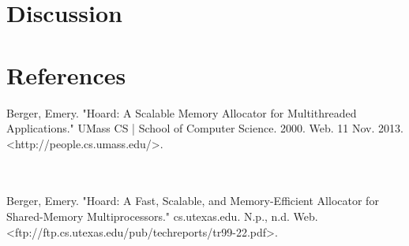 \documentclass{article}
\begin{document}
\section{Discussion}
 

\newpage
\noindent
\section{References}

Berger, Emery. "Hoard: A Scalable Memory Allocator for Multithreaded Applications." UMass CS | School of Computer Science. 2000. Web. 11 Nov. 2013. <http://people.cs.umass.edu/>.

\\
\\
Berger, Emery. "Hoard: A Fast, Scalable, and Memory-Efficient Allocator for Shared-Memory Multiprocessors." cs.utexas.edu. N.p., n.d. Web. <ftp://ftp.cs.utexas.edu/pub/techreports/tr99-22.pdf>.

\end{document}
